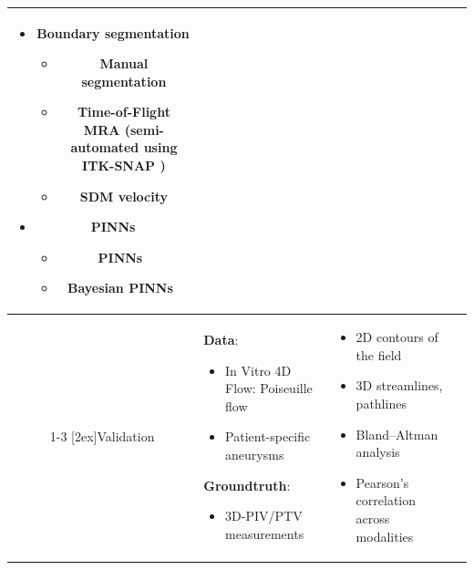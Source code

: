 \begin{table}[!h]
\begin{tabularx}{\textwidth}{c | X | X | X}
{\begin{minipage}{.25\textwidth}
\begin{itemize}[left=0em]
\begin{itemize}
                            \item iVFM \cite{assi2017_EchoIVFM}
                        \end{itemize}
                    \item Boundary segmentation
                        \begin{itemize}
                            \item Manual segmentation
                            \item Time-of-Flight MRA (semi-automated using ITK-SNAP \cite{yushkevich2006_ITKSNAP})
                            \item SDM velocity \cite{rothenberger2023_4DflowSDM}
                        \end{itemize}
                    \item PINNs
                        \begin{itemize}
                            \item PINNs~\cite{cai2021physics}
                            \item Bayesian PINNs~\cite{yang2021b}
                        \end{itemize}
                \end{itemize}
            \end{minipage}
        } \\
        \cmidrule{1-3}
        \multirow{8}{*}[2ex]{\centering Validation} & 
        \textbf{Data}:
        \begin{itemize}[left=0em]
            \item In Vitro 4D Flow: Poiseuille flow
            \item Patient-specific aneurysms
        \end{itemize}
        \textbf{Groundtruth}:
        \begin{itemize}[left=0em]
            \item 3D-PIV/PTV measurements
        \end{itemize} & 
        \begin{itemize}[left=0em]
            \item 2D contours of the field
            \item 3D streamlines, pathlines
            \item Bland–Altman analysis
            \item Pearson's correlation across modalities
        \end{itemize} & \\

\end{tabularx}
\end{table}
